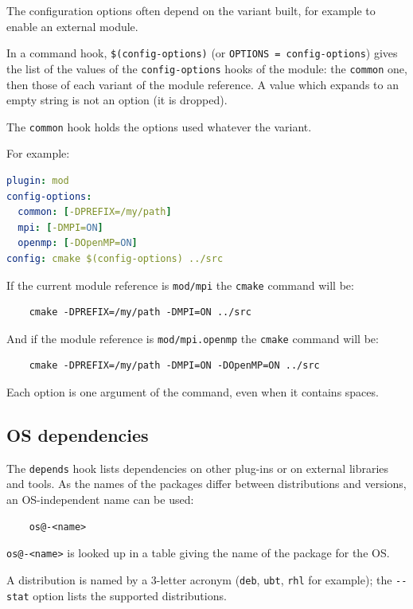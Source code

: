 \documentclass[a4paper,12pt,twoside]{article}
\newcommand{\code}[1]{\texttt{#1}}
\newcommand{\ddash}{-{}-}
\begin{document}
The configuration options often depend on the variant built, for example to enable an external module.

In a command hook, \code{\$(config-options)} (or \code{OPTIONS = config-options}) gives the list of the values of the \code{config-options} hooks of the module: the \code{common} one, then those of each variant of the module reference. A value which expands to an empty string is not an option (it is dropped).

The \code{common} hook holds the options used whatever the variant.

For example:

\begin{lstlisting}[language={yaml}]
plugin: mod
config-options:
  common: [-DPREFIX=/my/path]
  mpi: [-DMPI=ON]
  openmp: [-DOpenMP=ON]
config: cmake $(config-options) ../src
\end{lstlisting}

If the current module reference is \code{mod/mpi} the \code{cmake} command will be:

\begin{lstlisting}
	cmake -DPREFIX=/my/path -DMPI=ON ../src
\end{lstlisting}

And if the module reference is \code{mod/mpi.openmp} the \code{cmake} command will be:

\begin{lstlisting}
	cmake -DPREFIX=/my/path -DMPI=ON -DOpenMP=ON ../src
\end{lstlisting}

Each option is one argument of the command, even when it contains spaces.

\subsection{OS dependencies}
\label{os-deps}
\label{OS dependencies}

The \code{depends} hook lists dependencies on other plug-ins or on external libraries and tools. As the names of the packages differ between distributions and versions, an OS-independent name can be used:

\begin{lstlisting}
	os@-<name>
\end{lstlisting}

\code{os@-<name>} is looked up in a table giving the name of the package for the OS.

A distribution is named by a 3-letter acronym (\code{deb}, \code{ubt}, \code{rhl} for example); the \code{\ddash{}stat} option lists the supported distributions.
\end{document}
